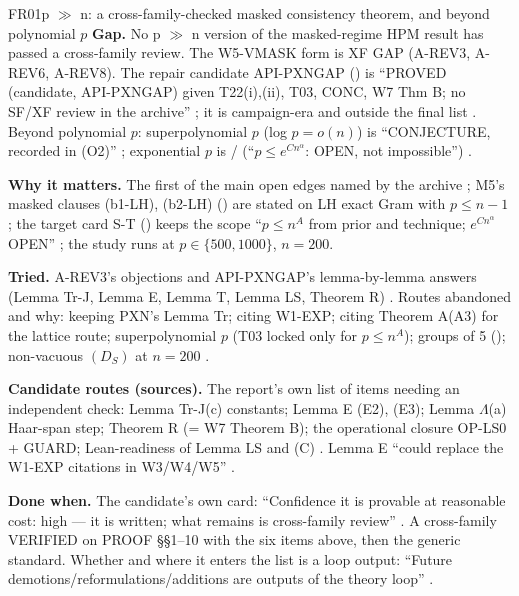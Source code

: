 \begin{card}{FR01}{p $\gg$ n: a cross-family-checked masked consistency theorem, and beyond polynomial $p$}
\textbf{Gap.} No p $\gg$ n version of the masked-regime HPM result has passed a cross-family review. The W5-VMASK form  is XF GAP (A-REV3, A-REV6, A-REV8). The repair candidate API-PXNGAP () is ``PROVED (candidate, API-PXNGAP) given T22(i),(ii), T03, CONC, W7 Thm B; no SF/XF review in the archive'' ; it is campaign-era and outside the final list . Beyond polynomial $p$: superpolynomial $p$ (log $p=o(n)$) is ``CONJECTURE, recorded in (O2)'' ; exponential $p$ is  /  (``$p\le e^{Cn^\alpha}$: OPEN, not impossible'') .

\textbf{Why it matters.} The first of the main open edges named by the archive ; M5's masked clauses (b1-LH), (b2-LH) () are stated on LH exact Gram with $p\le n-1$ ; the target card S-T () keeps the scope ``$p\le n^A$ from prior and technique; $e^{Cn^\alpha}$ OPEN'' ; the study runs at $p\in\{500,1000\}$, $n=200$.

\textbf{Tried.} A-REV3's objections and API-PXNGAP's lemma-by-lemma answers (Lemma Tr-J, Lemma E, Lemma T, Lemma LS, Theorem R) . Routes abandoned and why: keeping PXN's Lemma Tr; citing W1-EXP; citing Theorem A(A3) for the lattice route; superpolynomial $p$ (T03 locked only for $p\le n^A$); groups of 5 (); non-vacuous $(D_S)$ at $n=200$ .

\textbf{Candidate routes (sources).} The report's own list of items needing an independent check: Lemma Tr-J(c) constants; Lemma E (E2), (E3); Lemma $\Lambda$(a) Haar-span step; Theorem R (= W7 Theorem B); the operational closure OP-LS0 + GUARD; Lean-readiness of Lemma LS and (C) . Lemma E ``could replace the W1-EXP citations in W3/W4/W5'' .

\textbf{Done when.} The candidate's own card: ``Confidence it is provable at reasonable cost: high --- it is written; what remains is cross-family review'' . A cross-family VERIFIED on PROOF §§1--10 with the six items above, then the generic standard. Whether and where it enters the list is a loop output: ``Future demotions/reformulations/additions are outputs of the theory loop'' .

\end{card}
